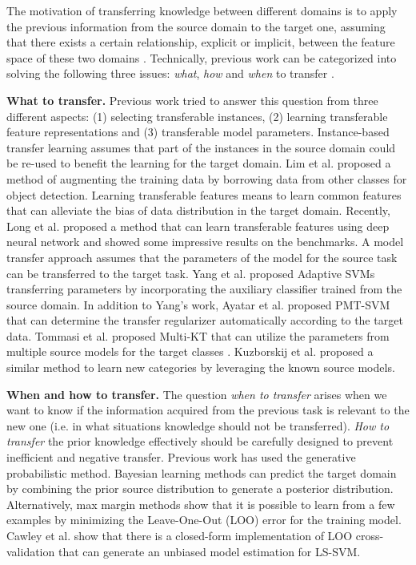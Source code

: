 The motivation of transferring knowledge between different domains is to apply the previous information from the source domain to the target one, assuming that there exists a certain relationship, explicit or implicit, between the feature space of these two domains \cite{pan2010survey}. Technically, previous work can be categorized into solving the following three issues: \textit{what}, \textit{how} and \textit{when} to transfer \cite{tommasi2014learning}.


\textbf{What to transfer.} Previous work tried to answer this question from three different aspects: (1) selecting transferable instances, (2) learning transferable feature representations and (3) transferable model parameters. Instance-based transfer learning assumes that part of the instances in the source domain could be re-used to benefit the learning for the target domain. Lim et al. \cite{lim2012transfer} proposed a method of augmenting the training data by borrowing data from other classes for object detection. Learning transferable features means to learn common features that can alleviate the bias of data distribution in the target domain. Recently, Long et al. \cite{LongICML15} proposed a method that can learn transferable features using deep neural network and showed some impressive results on the  benchmarks. A model transfer
approach assumes that the parameters of the model for the source task can be transferred to the target task. Yang et al. \cite{yang2007cross} proposed Adaptive SVMs transferring parameters by incorporating the auxiliary classifier trained from the source domain. In addition to Yang's work, Ayatar et al. \cite{aytar2011tabula} proposed PMT-SVM that can determine the transfer regularizer automatically according to the target data. Tommasi et al. \cite{tommasi2014learning} proposed Multi-KT that can utilize the parameters from multiple source models for the target classes .
Kuzborskij et al. \cite{kuzborskij2013n} proposed a similar method to learn new categories by leveraging the known source models.

\textbf{When and how to transfer.} The question \textit{when to transfer} arises when we want to know if the information acquired from the previous task is relevant to the new one (i.e. in what situations knowledge should not be transferred). 
\textit{How to transfer} the prior knowledge effectively should be carefully designed to prevent inefficient and negative transfer. Previous work \cite{davis2009deep} \cite{wang2014active} \cite{zhou2014multi} has used the generative probabilistic method. Bayesian learning methods can predict the target domain by combining the prior source distribution to generate a posterior distribution. Alternatively, max margin methods \cite{kuzborskij2013n} \cite{tommasi2010safety} show that it is possible to learn from a few examples by minimizing the  Leave-One-Out (LOO) error for the training model. Cawley et al. \cite{cawley2006leave} show that there is a closed-form implementation of LOO cross-validation that can generate an unbiased model estimation for LS-SVM.

